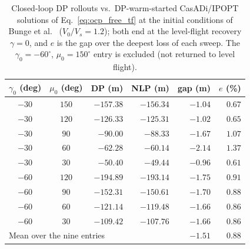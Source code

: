 \begin{table}[H]
    \centering
    \caption{Closed-loop DP rollouts vs.\ DP-warm-started CasADi/IPOPT solutions of Eq.~\eqref{eq:ocp_free_tf} at the initial conditions of Bunge et al.\ \cite{Bunge2018} ($V_0/V_s = 1.2$); both end at the level-flight recovery $\gamma = 0$, and $e$ is the gap over the deepest loss of each sweep. The $\gamma_0 = -60^\circ$, $\mu_0 = 150^\circ$ entry is excluded (not returned to level flight).}
    \label{tab:casadi_benchmark}
    \begin{tabular}{c c r r r r}
        \toprule
        $\gamma_0$ (deg) & $\mu_0$ (deg) & DP (m) & NLP (m) & gap (m) & $e$ (\%) \\
        \midrule
        $-30$ & $150$ & $-157.38$ & $-156.34$ & $-1.04$ & $0.67$ \\
        $-30$ & $120$ & $-126.33$ & $-125.31$ & $-1.02$ & $0.65$ \\
        $-30$ & $90$ & $-90.00$ & $-88.33$ & $-1.67$ & $1.07$ \\
        $-30$ & $60$ & $-62.28$ & $-60.14$ & $-2.14$ & $1.37$ \\
        $-30$ & $30$ & $-50.40$ & $-49.44$ & $-0.96$ & $0.61$ \\
        \midrule
        $-60$ & $120$ & $-194.89$ & $-193.14$ & $-1.75$ & $0.91$ \\
        $-60$ & $90$ & $-152.31$ & $-150.61$ & $-1.70$ & $0.88$ \\
        $-60$ & $60$ & $-121.14$ & $-119.48$ & $-1.66$ & $0.86$ \\
        $-60$ & $30$ & $-109.42$ & $-107.76$ & $-1.66$ & $0.86$ \\
        \midrule
        \multicolumn{4}{l}{Mean over the nine entries} & $-1.51$ & $0.88$ \\
        \bottomrule
    \end{tabular}
\end{table}
